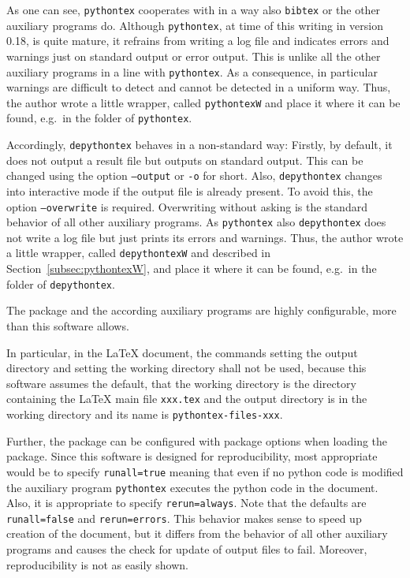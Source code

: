 As one can see, \texttt{pythontex} cooperates with \lualatex{} in a way 
also \texttt{bibtex} or the other auxiliary programs do. 
Although \texttt{pythontex}, at time of this writing in version 0.18, 
is quite mature, it refrains from writing a log file and indicates errors and warnings 
just on standard output or error output. 
This is unlike all the other auxiliary programs in a line with \texttt{pythontex}. 
As a consequence, in particular warnings are difficult to detect 
and cannot be detected in a uniform way. 
Thus, the author wrote a little wrapper, called \texttt{pythontexW} 
and place it where it can be found, e.g.~in the folder of \texttt{pythontex}. 

Accordingly, \texttt{depythontex} behaves in a non-standard way: 
Firstly, by default, it does not output a result file but outputs on standard output. 
This can be changed using the option \texttt{--output} or \texttt{-o} for short. 
Also, \texttt{depythontex} changes into interactive mode 
if the output file is already present. 
To avoid this, the option \texttt{--overwrite} is required. 
Overwriting without asking is the standard behavior of all other auxiliary programs. 
As \texttt{pythontex} also \texttt{depythontex} does not write a log file 
but just prints its errors and warnings. 
Thus, the author wrote a little wrapper, 
called \texttt{depythontexW} and described in Section~\ref{subsec:pythontexW}, 
and place it where it can be found, e.g.~in the folder of \texttt{depythontex}. 
\medskip


The package  and the according auxiliary programs are highly configurable, 
more than this software allows. 

In particular, in the \LaTeX{} document, 
the commands  setting the output directory 
and  setting the working directory shall not be used, 
because this software assumes the default, that the working directory is the directory 
containing the \LaTeX{} main file \texttt{xxx.tex}
and the output directory is in the working directory 
and its name is \texttt{pythontex-files-xxx}. 

Further, the package  can be configured with package options when loading the package. 
Since this software is designed for reproducibility, 
most appropriate would be to specify \texttt{runall=true} meaning that even if no python code is modified 
the auxiliary program \texttt{pythontex} executes the python code in the document. 
Also, it is appropriate to specify \texttt{rerun=always}. 
Note that the defaults are \texttt{runall=false} and \texttt{rerun=errors}. 
This behavior makes sense to speed up creation of the document, 
but it differs from the behavior of all other auxiliary programs 
and causes the check for update of output files to fail. 
Moreover, reproducibility is not as easily shown. 

